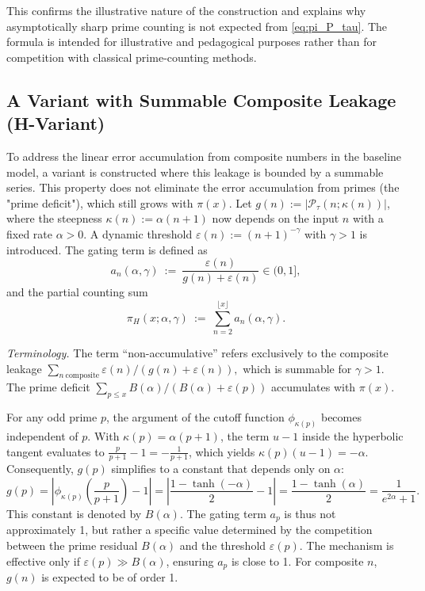\documentclass[11pt,a4paper]{amsart}
\theoremstyle{plain}
\theoremstyle{definition}
\theoremstyle{remark}
\begin{document}
This confirms the illustrative nature of the construction and explains why asymptotically sharp prime counting is not expected from \eqref{eq:pi_P_tau}. The formula is intended for illustrative and pedagogical purposes rather than for competition with classical prime-counting methods.

\subsection{A Variant with Summable Composite Leakage (H-Variant)}

To address the linear error accumulation from composite numbers in the baseline model, a variant is constructed where this leakage is bounded by a summable series. This property does not eliminate the error accumulation from primes (the "prime deficit"), which still grows with $\pi(x)$. Let $g(n):=|\mathcal P_\tau(n;\kappa(n))|$, where the steepness $\kappa(n):=\alpha(n+1)$ now depends on the input $n$ with a fixed rate $\alpha>0$. A dynamic threshold $\varepsilon(n):=(n+1)^{-\gamma}$ with $\gamma>1$ is introduced. The gating term is defined as
\[
a_n(\alpha,\gamma)\ :=\ \frac{\varepsilon(n)}{g(n)+\varepsilon(n)}\in(0,1],
\]
and the partial counting sum
\begin{equation}\label{eq:pi_H}
\pi_H(x;\alpha,\gamma)\ :=\ \sum_{n=2}^{\lfloor x\rfloor} a_n(\alpha,\gamma).
\end{equation}

\noindent\emph{Terminology.} The term “non-accumulative” refers exclusively to the composite leakage
\(
\sum_{n\ \mathrm{composite}} \varepsilon(n)/(g(n)+\varepsilon(n)),
\)
which is summable for $\gamma>1$. The prime deficit
\(
\sum_{p\le x} B(\alpha)/(B(\alpha)+\varepsilon(p))
\)
accumulates with $\pi(x)$.

For any odd prime $p$, the argument of the cutoff function $\phi_{\kappa(p)}$ becomes independent of $p$. With $\kappa(p)=\alpha(p+1)$, the term $u-1$ inside the hyperbolic tangent evaluates to $\frac{p}{p+1}-1 = -\frac{1}{p+1}$, which yields $\kappa(p)(u-1)=-\alpha$. Consequently, $g(p)$ simplifies to a constant that depends only on $\alpha$:
\[
g(p) = \left|\phi_{\kappa(p)}\!\left(\frac{p}{p+1}\right)-1\right| = \left|\frac{1-\tanh(-\alpha)}{2}-1\right| = \frac{1-\tanh(\alpha)}{2} = \frac{1}{e^{2\alpha}+1}.
\]
This constant is denoted by $B(\alpha)$. The gating term $a_p$ is thus not approximately 1, but rather a specific value determined by the competition between the prime residual $B(\alpha)$ and the threshold $\varepsilon(p)$. The mechanism is effective only if $\varepsilon(p) \gg B(\alpha)$, ensuring $a_p$ is close to 1. For composite $n$, $g(n)$ is expected to be of order 1.
\end{document}
